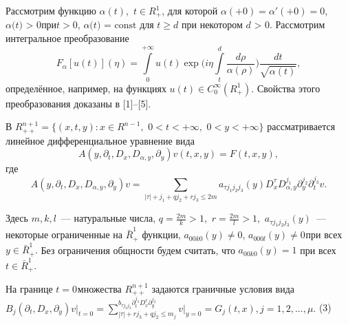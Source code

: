 


\vzmscaption

Рассмотрим функцию $\alpha (t),\,\,t \in R_ + ^1 $, для которой $\alpha ( +
0) = {\alpha }'( + 0) = 0$, $\alpha \mbox{(}t\mbox{) > 0}$при$t > 0$,
$\alpha \mbox{(}t\mbox{) = const}$ для $t \geqslant d$ при некотором $d\mbox{ >
0}$. Рассмотрим интегральное преобразование
\[
F_\alpha [u(t)](\eta ) = \int\limits_0^{ + \infty } {u(t)\exp (i\eta }
\int\limits_t^d {\frac{d\rho }{\alpha (\rho )}} )\frac{dt}{\sqrt {\alpha
(t)} },
\]
определённое, например, на функциях
$u(t) \in C_0^\infty (R_ + ^1 )$.
Свойства этого преобразования доказаны в [1]--[5].

В $R_{ + + }^{n + 1} = \{(x,t,y):x \in R^{n - 1},\,\,0 < t < + \infty ,\,\,0
< y < + \infty \}$ рассматривается линейное дифференциальное уравнение вида
\begin{equation}
\label{eq4700}
A(y,\partial _t ,D_x ,D_{\alpha ,y} ,\partial _y )v(t,x,y) = F(t,x,y),
\end{equation}
где
\begin{equation}
\label{eq4701}
A(y,\partial _t ,D_x ,D_{\alpha ,y} ,\partial _y )v = \sum\limits_{\left|
\tau \right| + j_1 + qj_2 + rj_3 \leqslant 2m} {a_{\tau j_1 j_2 j_3 } (y)D_x^\tau
D_{\alpha ,y}^{j_1 } } \partial _y^{j_2 } \partial _t^{j_3 } v.
\end{equation}



Здесь $m,k,l$~--- натуральные числа, $q = \frac{2m}{k} > 1,\,\,r = \frac{2m}{l} >
1,\,\,a_{\tau j_1 j_2 j_3 } (y)$~--- некоторые ограниченные на $\bar {R}_ + ^1
$ функции,
\linebreak
$a_{00k0} (y) \ne 0$, $a_{000l} (y) \ne 0_{ }$при всех$y \in
\bar {R}_ + ^1 .$ Без ограничения общности будем считать, что $a_{00k0} (y)
= 1$ при всех $t \in \bar {R}_ + ^1 .$

На границе $t = 0_{ }$множества $R_{ + + }^{n + 1} $ задаются граничные
условия вида$B_j (\partial _t ,D_x ,\partial _y )\left. v \right|_{t = 0} =
\sum\limits_{\left| \tau \right| + rj_3 + qj_2 \leqslant m_j }^ {b_{\tau j_2 j_3 }
\partial _t^{j_3 } D_x^\tau \partial _y^{j_2 } } \left. v \right|_{y = 0} =
G_j (t,x),j = 1,2,...,\mu .$ (3)

